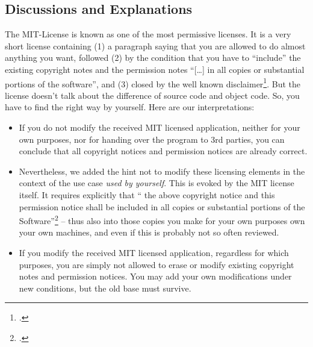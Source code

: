 \subsection{Discussions and Explanations}

The MIT-License is known as one of the most permissive licenses. It is a very
short license containing (1) a paragraph saying that you are allowed to do
almost anything you want, followed (2) by the condition that you have to
\enquote{include} the existing copyright notes and the permission notes
\enquote{[\ldots] in all copies or substantial portions of the software}, and
(3) closed by the well known disclaimer\footcite[cf.][\nopage
wp]{MitLicense2012a}. But the license doesn't talk about the difference of
source code and object code. So, you have to find the right way by yourself.
Here are our interpretations:

\begin{itemize}
  \item If you do not modify the received MIT licensed application, neither for
  your own purposes, nor for handing over the program to 3rd parties, you can
  conclude that all copyright notices and permission notices are already
  correct.
  \item Nevertheless, we added the hint not to modify these licensing elements
  in the context of the use case \emph{used by yourself}. This is evoked by the
  MIT license itself. It requires explicitly that \enquote{ the above copyright
  notice and this permission notice shall be included in all copies or
  substantial portions of the Software}\footcite[cf.][\nopage
  wp]{MitLicense2012a} -- thus also into those copies you make for your own
  purposes own your own machines, and even if this is probably not so often
  reviewed.
  \item If you modify the received MIT licensed application, regardless for
  which purposes, you are simply not allowed to erase or modify existing
  copyright notes and permission notices. You may add your own modifications
  under new conditions, but the old base must survive.
\end{itemize}

%

